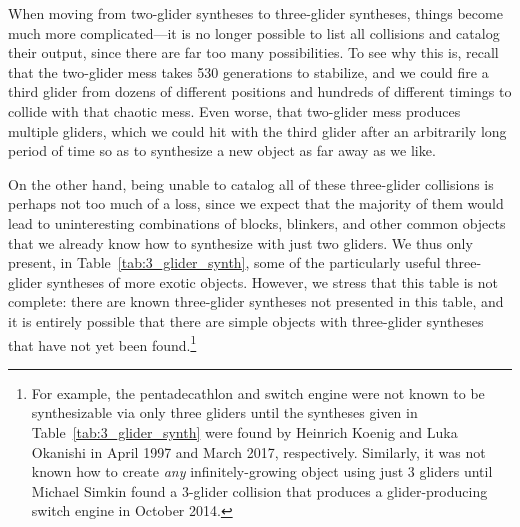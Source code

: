 When moving from two-glider syntheses to three-glider syntheses, things become much more complicated---it is no longer possible to list all collisions and catalog their output, since there are far too many possibilities. To see why this is, recall that the two-glider mess takes 530 generations to stabilize, and we could fire a third glider from dozens of different positions and hundreds of different timings to collide with that chaotic mess. Even worse, that two-glider mess produces multiple gliders, which we could hit with the third glider after an arbitrarily long period of time so as to synthesize a new object as far away as we like.

On the other hand, being unable to catalog all of these three-glider collisions is perhaps not too much of a loss, since we expect that the majority of them would lead to uninteresting combinations of blocks, blinkers, and other common objects that we already know how to synthesize with just two gliders. We thus only present, in Table~\ref{tab:3_glider_synth}, some of the particularly useful three-glider syntheses of more exotic objects. However, we stress that this table is not complete: there are known three-glider syntheses not presented in this table, and it is entirely possible that there are simple objects with three-glider syntheses that have not yet been found.\footnote{For example, the pentadecathlon and switch engine were not known to be synthesizable via only three gliders until the syntheses given in Table~\ref{tab:3_glider_synth} were found by Heinrich Koenig and Luka Okanishi in April 1997 and March 2017, respectively. Similarly, it was not known how to create \emph{any} infinitely-growing object using just $3$ gliders until Michael Simkin found a $3$-glider collision that produces a glider-producing switch engine in October 2014.}

